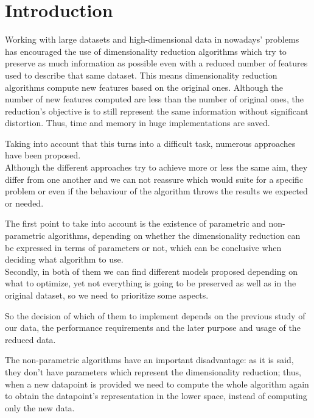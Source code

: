 \documentclass[a4paper,11pt,spanish]{report}
\begin{document}
\newpage
{}


\chapter{Introduction}
\label{chap:intro}

Working with large datasets and high-dimensional data in nowadays' problems has encouraged the use of dimensionality reduction algorithms which try to preserve as much information as possible even with a reduced number of features used to describe that same dataset. This means  dimensionality reduction algorithms compute new features based on the original ones. Although the number of new features computed are less than the number of original ones, the reduction's objective is to still represent the same information without significant distortion. Thus, time and memory in huge implementations are saved.

Taking into account that this turns into a difficult task, numerous approaches have been proposed.\\
Although the different approaches try to achieve more or less the same aim, they differ from one another and we can not reassure which would suite for a specific problem or even if the behaviour of the algorithm throws the results we expected or needed.

The first point to take into account is the existence of parametric and non-parametric algorithms, depending on whether the dimensionality reduction can be expressed in terms of parameters or not, which can be conclusive when deciding what algorithm to use.\\
Secondly, in both of them we can find different models proposed depending on what to optimize, yet not everything is going to be preserved as well as in the original dataset, so we need to prioritize some aspects.

So the decision of which of them to implement depends on the previous study of our data, the performance requirements and the later purpose and usage of the reduced data.

The non-parametric algorithms have an important disadvantage: as it is said, they don't have parameters which represent the dimensionality reduction; thus, when a new datapoint is provided we need to compute the whole algorithm again to obtain the datapoint's representation in the lower space, instead of computing only the new data.
\end{document}
